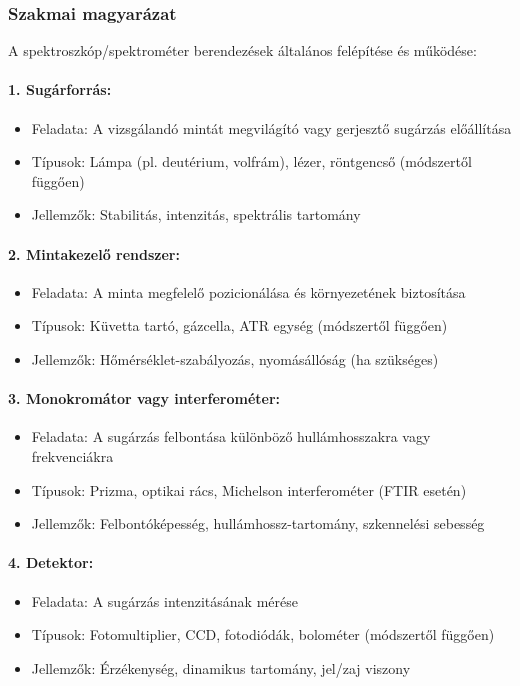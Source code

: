\documentclass[a4paper,12pt]{article}
\begin{document}
\subsubsection{Szakmai magyarázat} A spektroszkóp/spektrométer berendezések általános felépítése és működése:

\paragraph{1. Sugárforrás:} \begin{itemize} \item Feladata: A vizsgálandó mintát megvilágító vagy gerjesztő sugárzás előállítása \item Típusok: Lámpa (pl. deutérium, volfrám), lézer, röntgencső (módszertől függően) \item Jellemzők: Stabilitás, intenzitás, spektrális tartomány \end{itemize}

\paragraph{2. Mintakezelő rendszer:} \begin{itemize} \item Feladata: A minta megfelelő pozicionálása és környezetének biztosítása \item Típusok: Küvetta tartó, gázcella, ATR egység (módszertől függően) \item Jellemzők: Hőmérséklet-szabályozás, nyomásállóság (ha szükséges) \end{itemize}

\paragraph{3. Monokromátor vagy interferométer:} \begin{itemize} \item Feladata: A sugárzás felbontása különböző hullámhosszakra vagy frekvenciákra \item Típusok: Prizma, optikai rács, Michelson interferométer (FTIR esetén) \item Jellemzők: Felbontóképesség, hullámhossz-tartomány, szkennelési sebesség \end{itemize}

\paragraph{4. Detektor:} \begin{itemize} \item Feladata: A sugárzás intenzitásának mérése \item Típusok: Fotomultiplier, CCD, fotodiódák, bolométer (módszertől függően) \item Jellemzők: Érzékenység, dinamikus tartomány, jel/zaj viszony \end{itemize}
\end{document}
